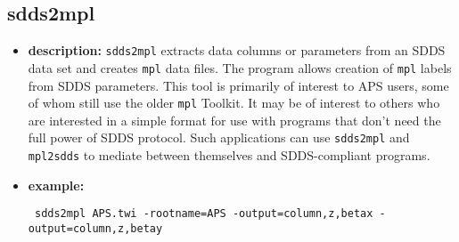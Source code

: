 \newpage
\subsection{sdds2mpl}
\label{sdds2mpl}

\begin{itemize}
\item {\bf description:} 
\verb|sdds2mpl| extracts data columns or parameters from an SDDS data set and creates \verb|mpl| data files.  The 
program allows creation of \verb|mpl| labels from SDDS parameters.  This tool is primarily of interest to APS
users, some of whom still use the older {\tt mpl} Toolkit.  It may be of interest to others who are interested in
a simple format for use with programs that don't need the full power of SDDS protocol.  Such applications can use
{\tt sdds2mpl} and {\tt mpl2sdds} to mediate between themselves and SDDS-compliant programs.

\item {\bf example:} 
\begin{flushleft}{\tt
sdds2mpl APS.twi -rootname=APS -output=column,z,betax -output=column,z,betay
}\end{flushleft}


\end{itemize}
